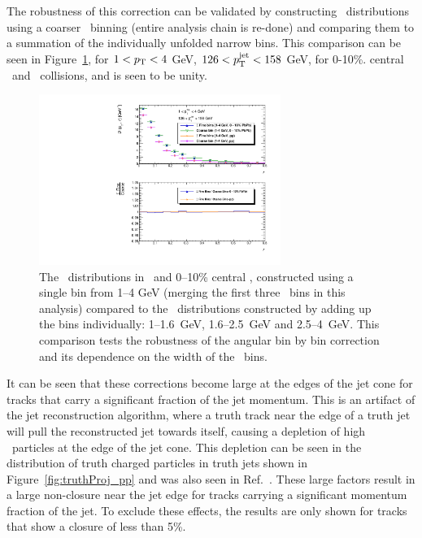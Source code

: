 The robustness of this correction can be validated by constructing \Dptr\ distributions using a coarser \pt\ binning (entire analysis chain is re-done) and comparing them to a summation of the individually unfolded narrow bins.
This comparison can be seen in Figure~\ref{fig:MergedBinCheck}, for $1 < \mbox{$p_{\mathrm{T}}$} < 4$ GeV, $126 < \mbox{$p_{\mathrm{T}}^{\mathrm{jet}}$} < 158$ GeV,  for 0-10\%.
central \pbpb\ and \pp\ collisions, and is seen to be unity.

\begin{figure}
\centering
\includegraphics[width=0.7\textwidth]{figures/main/general/MergedBinCheck.pdf}
\caption{The \Dptr\ distributions in \pp\ and 0--10\% central \pbpb, constructed using a single bin from 1--4 GeV (merging the first three \pt\ bins in this analysis) compared to the \Dptr\ distributions constructed by adding up the bins individually: \mbox{1--1.6 GeV}, \mbox{1.6--2.5 GeV} and \mbox{2.5--4 GeV}.
This comparison tests the robustness of the angular bin by bin correction and its dependence on the width of the \pt\ bins.}
\label{fig:MergedBinCheck}
\end{figure}


It can be seen that these corrections become large at the edges of the jet cone for tracks that carry a significant fraction of the jet momentum.
This is an artifact of the jet reconstruction algorithm, where a truth track near the edge of a truth jet will pull the reconstructed jet towards itself, causing a depletion of high \pt\ particles at the edge of the jet cone.
This depletion can be seen in the distribution of truth charged particles in truth jets shown in Figure~\ref{fig:truthProj_pp} and was also seen in Ref.~\cite{Choudalakis:1248716}.
These large factors result in a large non-closure near the jet edge for tracks carrying a significant momentum fraction of the jet.
To exclude these effects, the results are only shown for tracks that show a closure of less than 5\%.

